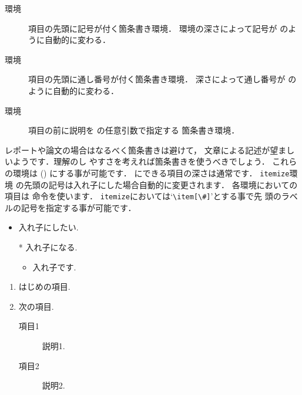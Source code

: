 {\begin{description}
\item[ 環境]
  項目の先頭に記号が付く箇条書き環境．
  環境の深さによって記号が
  のように自動的に変わる．
\item[ 環境]%
%
  項目の先頭に通し番号が付く箇条書き環境．
  深さによって通し番号が
  のように自動的に変わる．
\item[ 環境]
  項目の前に説明を  の任意引数で指定する
  箇条書き環境．
\end{description}


レポートや論文の場合はなるべく箇条書きは避けて，
文章による記述が望ましいようです．理解のし
やすさを考えれば箇条書きを使うべきでしょう．
これらの環境は () にする事が可能です．
にできる項目の深さは通常です．
\texttt{itemize}環境
の先頭の記号は入れ子にした場合自動的に変更されます．
各環境においての項目は  命令を使います．
\texttt{itemize}においては`\verb|\item[\#]|'とする事で先
頭のラベルの記号を指定する事が可能です．


\begin{InOut}
\begin{itemize}
  \item 入れ子にしたい.
  \item[*]  入れ子になる.
  \begin{itemize}
     \item 入れ子です.
    \end{itemize}
\end{itemize}
\end{InOut}
\begin{InOut}
\begin{enumerate}
  \item はじめの項目.
  \item 次の項目.
  \begin{description}
    \item[項目1] 説明1.
    \item[項目2] 説明2.
  \end{description}
\end{enumerate} 
\end{InOut}

}
